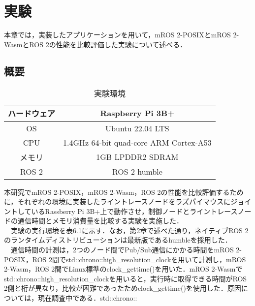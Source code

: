 \chapter{実験}
\label{chap:evaluation}
本章では，実装したアプリケーションを用いて，mROS 2-POSIXとmROS 2-WasmとROS 2の性能を比較評価した実験について述べる．
\section{概要}
\begin{table}[HT]
    \caption{実験環境}
    \label{tab:experiment}
    \centering
    \begin{tabular}{|c|c|} \hline
      ハードウェア & Raspberry Pi 3B+ \\ \hline
      OS & Ubuntu 22.04 LTS \\ \hline
      CPU & 1.4GHz 64-bit quad-core ARM Cortex-A53 \\ \hline
      メモリ & 1GB LPDDR2 SDRAM \\ \hline
      ROS 2 & ROS 2 humble \\ \hline
    \end{tabular}
  \end{table}
本研究でmROS 2-POSIX，mROS 2-Wasm，ROS 2の性能を比較評価するために，それぞれの環境に実装したライントレースノードをラズパイマウスにジョイントしているRassberry Pi 3B+上で動作させ，制御ノードとライントレースノードの通信時間とメモリ消費量を比較する実験を実施した．
\\　実験の実行環境を表6.1に示す．なお，第2章で述べた通り，ネイティブROS 2のランタイムディストリビューションは最新版であるhumbleを採用した．
\\　通信時間の計測は，2つのノード間でPub/Sub通信にかかる時間をmROS 2-POSIX，ROS 2間でstd::chrono::high\_resolution\_clockを用いて計測し，mROS 2-Wasm，ROS 2間でLinux標準のclock_gettime()を用いた．mROS 2-Wasmでstd::chrono::high\_resolution\_clockを用いると，実行時に取得できる時間がROS 2側と桁が異なり，比較が困難であったためclock_gettime()を使用した．原因については，現在調査中である．std::chrono::


